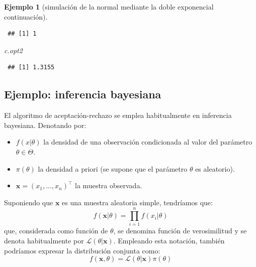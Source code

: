 \documentclass[
  spanish,
  10pt,
]{book}
\newenvironment{Shaded}{\begin{snugshade}}{\end{snugshade}}
\newcommand{\AttributeTok}[1]{\textcolor[rgb]{0.13,0.29,0.53}{#1}}
\newcommand{\CommentTok}[1]{\textcolor[rgb]{0.56,0.35,0.01}{\textit{#1}}}
\newcommand{\DecValTok}[1]{\textcolor[rgb]{0.00,0.00,0.81}{#1}}
\newcommand{\FloatTok}[1]{\textcolor[rgb]{0.00,0.00,0.81}{#1}}
\newcommand{\FunctionTok}[1]{\textcolor[rgb]{0.13,0.29,0.53}{\textbf{#1}}}
\newcommand{\NormalTok}[1]{#1}
\newcommand{\OtherTok}[1]{\textcolor[rgb]{0.56,0.35,0.01}{#1}}
\newcommand{\SpecialCharTok}[1]{\textcolor[rgb]{0.81,0.36,0.00}{\textbf{#1}}}
\renewcommand{\mathbf}[1]{\symbf{#1}}
\theoremstyle{break}
\newtheorem{example}{Ejemplo}[chapter]
\theoremstyle{nonumberplain}
\renewcommand{\CommentTok}[1]{\textcolor[rgb]{0.41,0.41,0.41}{\texttt{#1}}}
\begin{document}
\begin{example}[simulación de la normal mediante la doble exponencial continuación]
\begin{Shaded}
\end{Shaded}

\begin{verbatim}
 ## [1] 1
\end{verbatim}

\begin{Shaded}
\begin{Highlighting}[]
\NormalTok{c.opt2}
\end{Highlighting}
\end{Shaded}

\begin{verbatim}
 ## [1] 1.3155
\end{verbatim}

\end{example}

\subsection{Ejemplo: inferencia bayesiana}\label{bayes-ar}

El algoritmo de aceptación-rechazo se emplea habitualmente en inferencia bayesiana.
Denotando por:

\begin{itemize}
\item
  \(f(x | \theta)\) la densidad de una observación condicionada al valor del parámetro \(\theta \in \Theta\).
\item
  \(\pi(\theta)\) la densidad a priori (se supone que el parámetro \(\theta\) es aleatorio).
\item
  \(\mathbf{x}=(x_1,...,x_n)^{\top}\) la muestra observada.
\end{itemize}

Suponiendo que \(\mathbf{x}\) es una muestra aleatoria simple, tendríamos que:
\[f(\mathbf{x}|\theta) = \prod\limits_{i=1}^{n}f(x_i | \theta)\]
que, considerada como función de \(\theta\), se denomina función de verosimilitud y se denota habitualmente por \(\mathcal{L}(\theta | \mathbf{x})\).
Empleando esta notación, también podríamos expresar la distribución conjunta como:
\[f(\mathbf{x}, \theta) = \mathcal{L}(\theta | \mathbf{x})\pi(\theta)\]
\end{document}
